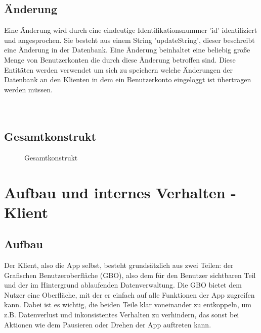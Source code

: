 \documentclass[parskip=full,11pt]{scrartcl}
\begin{document}
\pagebreak

\subsection{Änderung}
Eine Änderung wird durch eine eindeutige Identifikationsnummer 'id'
identifiziert und angesprochen. Sie besteht aus einem String 'updateString',
dieser beschreibt eine Änderung in der Datenbank.
Eine Änderung beinhaltet eine beliebig große Menge von Benutzerkonten die durch
diese Änderung betroffen sind.
Diese Entitäten werden verwendet um sich zu speichern welche Änderungen der
Datenbank an den Klienten in dem ein Benutzerkonto eingeloggt ist übertragen
werden müssen.
\\
\\
\\

\pagebreak



\subsection{Gesamtkonstrukt}
\begin{figure}[!htb]
    \centering
    \def\svgwidth{540pt}
    \caption{Gesamtkonstrukt}
    \label{fig:erd-complete}
\end{figure}

\section{Aufbau und internes Verhalten - Klient}

\subsection{Aufbau}

Der Klient, also die App selbst, besteht grundsätzlich aus zwei Teilen:
der Grafischen Benutzeroberfläche (GBO), also dem für den Benutzer
sichtbaren Teil und der im Hintergrund ablaufenden Datenverwaltung.
Die GBO bietet dem Nutzer eine Oberfläche, mit der er einfach auf alle
Funktionen der App zugreifen kann.
Dabei ist es wichtig, die beiden Teile klar voneinander zu entkoppeln,
um z.B. Datenverlust und inkonsistentes Verhalten zu verhindern, das sonst
bei Aktionen wie dem Pausieren oder Drehen der App auftreten kann.
\end{document}
